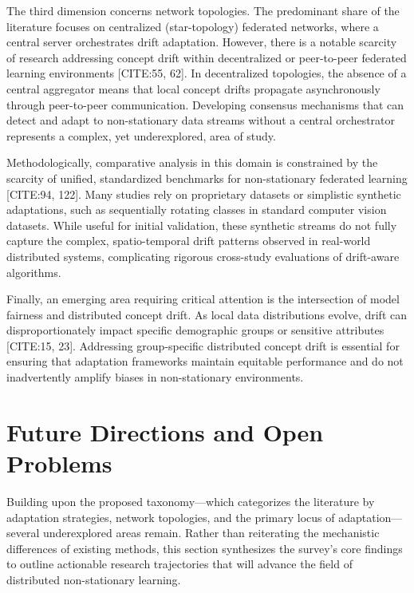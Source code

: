 \documentclass[journal]{IEEEtran}
\begin{document}
The third dimension concerns network topologies. The predominant share of the literature focuses on centralized (star-topology) federated networks, where a central server orchestrates drift adaptation. However, there is a notable scarcity of research addressing concept drift within decentralized or peer-to-peer federated learning environments [CITE:55, 62]. In decentralized topologies, the absence of a central aggregator means that local concept drifts propagate asynchronously through peer-to-peer communication. Developing consensus mechanisms that can detect and adapt to non-stationary data streams without a central orchestrator represents a complex, yet underexplored, area of study.

Methodologically, comparative analysis in this domain is constrained by the scarcity of unified, standardized benchmarks for non-stationary federated learning [CITE:94, 122]. Many studies rely on proprietary datasets or simplistic synthetic adaptations, such as sequentially rotating classes in standard computer vision datasets. While useful for initial validation, these synthetic streams do not fully capture the complex, spatio-temporal drift patterns observed in real-world distributed systems, complicating rigorous cross-study evaluations of drift-aware algorithms.

Finally, an emerging area requiring critical attention is the intersection of model fairness and distributed concept drift. As local data distributions evolve, drift can disproportionately impact specific demographic groups or sensitive attributes [CITE:15, 23]. Addressing group-specific distributed concept drift is essential for ensuring that adaptation frameworks maintain equitable performance and do not inadvertently amplify biases in non-stationary environments.

\section{Future Directions and Open Problems}
\label{sec:future_directions}

Building upon the proposed taxonomy—which categorizes the literature by adaptation strategies, network topologies, and the primary locus of adaptation—several underexplored areas remain. Rather than reiterating the mechanistic differences of existing methods, this section synthesizes the survey's core findings to outline actionable research trajectories that will advance the field of distributed non-stationary learning.
\end{document}
